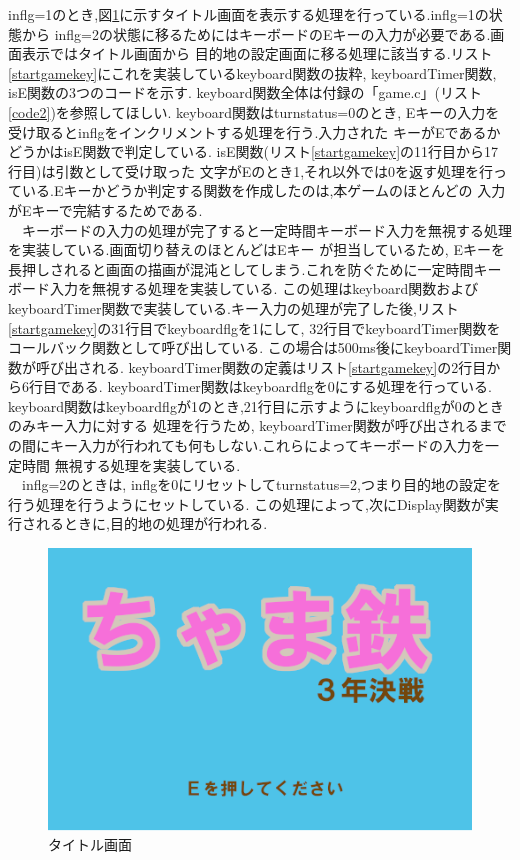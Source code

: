 \documentclass[a4j]{jarticle}
\begin{document}
    inflg=1のとき,図\ref{title}に示すタイトル画面を表示する処理を行っている.inflg=1の状態から
    inflg=2の状態に移るためにはキーボードのEキーの入力が必要である.画面表示ではタイトル画面から
    目的地の設定画面に移る処理に該当する.リスト\ref{startgamekey}にこれを実装しているkeyboard関数の抜粋, 
    keyboardTimer関数, isE関数の3つのコードを示す. keyboard関数全体は付録の「game.c」(リスト\ref{code2})を参照してほしい.
    keyboard関数はturnstatus=0のとき, Eキーの入力を受け取るとinflgをインクリメントする処理を行う.入力された
    キーがEであるかどうかはisE関数で判定している. isE関数(リスト\ref{startgamekey}の11行目から17行目)は引数として受け取った
    文字がEのとき1,それ以外では0を返す処理を行っている.Eキーかどうか判定する関数を作成したのは,本ゲームのほとんどの
    入力がEキーで完結するためである.\\
    　キーボードの入力の処理が完了すると一定時間キーボード入力を無視する処理を実装している.画面切り替えのほとんどはEキー
    が担当しているため, Eキーを長押しされると画面の描画が混沌としてしまう.これを防ぐために一定時間キーボード入力を無視する処理を実装している.
    この処理はkeyboard関数およびkeyboardTimer関数で実装している.キー入力の処理が完了した後,リスト\ref{startgamekey}の31行目でkeyboardflgを1にして,
    32行目でkeyboardTimer関数をコールバック関数として呼び出している.
    この場合は500ms後にkeyboardTimer関数が呼び出される. keyboardTimer関数の定義はリスト\ref{startgamekey}の2行目から6行目である.
    keyboardTimer関数はkeyboardflgを0にする処理を行っている. keyboard関数はkeyboardflgが1のとき,21行目に示すようにkeyboardflgが0のときのみキー入力に対する
    処理を行うため, keyboardTimer関数が呼び出されるまでの間にキー入力が行われても何もしない.これらによってキーボードの入力を一定時間
    無視する処理を実装している.\\
    　inflg=2のときは, inflgを0にリセットしてturnstatus=2,つまり目的地の設定を行う処理を行うようにセットしている.
    この処理によって,次にDisplay関数が実行されるときに,目的地の処理が行われる.

    \begin{figure}[H]
        \centering
        \includegraphics[scale=1.7]{sp4.png}
        \caption{タイトル画面}
         \label{title}
        \end{figure}   
    
\end{document}
